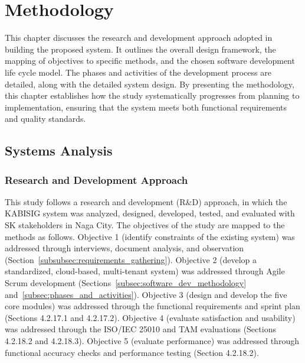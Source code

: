 \chapter{Methodology}
\label{ch:methodology}

\hspace*{\parindent}This chapter discusses the research and development approach adopted in building the proposed system. It outlines the overall design framework, the mapping of objectives to specific methods, and the chosen software development life cycle model. The phases and activities of the development process are detailed, along with the detailed system design. By presenting the methodology, this chapter establishes how the study systematically progresses from planning to implementation, ensuring that the system meets both functional requirements and quality standards.
\vspace{5mm}

\section{Systems Analysis}
\label{sec:systems_analysis}

\subsection{Research and Development Approach}
\label{subsec:research_dev_approach}

\hspace*{\parindent}This study follows a research and development (R\&D) approach, in which the KABISIG system was analyzed, designed, developed, tested, and evaluated with SK stakeholders in Naga City. The objectives of the study are mapped to the methods as follows. Objective 1 (identify constraints of the existing system) was addressed through interviews, document analysis, and observation (Section~\ref{subsubsec:requirements_gathering}). Objective 2 (develop a standardized, cloud-based, multi-tenant system) was addressed through Agile Scrum development (Sections~\ref{subsec:software_dev_methodology} and~\ref{subsec:phases_and_activities}). Objective 3 (design and develop the five core modules) was addressed through the functional requirements and sprint plan (Sections 4.2.17.1 and 4.2.17.2). Objective 4 (evaluate satisfaction and usability) was addressed through the ISO/IEC 25010 and TAM evaluations (Sections 4.2.18.2 and 4.2.18.3). Objective 5 (evaluate performance) was addressed through functional accuracy checks and performance testing (Section 4.2.18.2).
\vspace{5mm}

